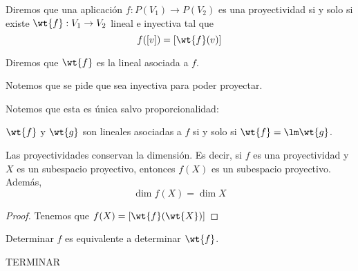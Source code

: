 \begin{definicion}[Proyectividad]
    Diremos que una aplicación $f:P(V_1)\to P(V_2)$ es una proyectividad si y solo si existe $\wt{f}:V_1\to V_2$ lineal e inyectiva tal que
    \begin{equation*}
        f([v])=[\wt{f}(v)]
    \end{equation*}

    Diremos que $\wt{f}$ es la lineal asociada a $f$.
\end{definicion}

Notemos que se pide que sea inyectiva para poder proyectar.


Notemos que esta es única salvo proporcionalidad:
\begin{prop}
    $\wt{f}$ y $\wt{g}$ son lineales asociadas a $f$ si y solo si $\wt{f}=\lm \wt{g}$.
\end{prop}

\begin{prop}
    Las proyectividades conservan la dimensión. Es decir, si $f$ es una proyectividad y $X$ es un subespacio proyectivo, entonces $f(X)$ es un subespacio proyectivo. Además,
    \begin{equation*}
        \dim f(X)=\dim X
    \end{equation*}
\end{prop}
\begin{proof}
    Tenemos que $f(X)=[\wt{f}(\wt{X})]$
\end{proof}



Determinar $f$ es equivalente a determinar $\wt{f}$.


TERMINAR